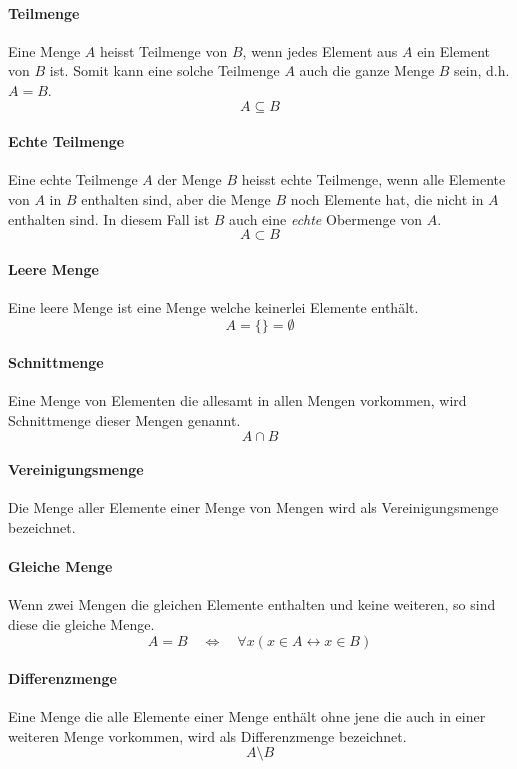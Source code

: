 \paragraph{Teilmenge} 
Eine Menge $A$ heisst \gls{Teilmenge} von $B$, wenn jedes Element aus 
$A$ ein Element von $B$ ist. Somit kann eine solche Teilmenge $A$
auch die ganze Menge $B$ sein, d.h. $A=B$.
\[ 
	A \subseteq B
\]
\paragraph{Echte Teilmenge}
Eine \gls{echte Teilmenge} $A$ der Menge $B$ heisst echte Teilmenge, wenn
alle Elemente von $A$ in $B$ enthalten sind, aber die Menge $B$ noch
Elemente hat, die nicht in $A$ enthalten sind. In diesem Fall ist $B$ 
auch eine \emph{echte} Obermenge von $A$.
\[
	A \subset B
\]

\paragraph{Leere Menge} Eine \gls{leere Menge} ist eine Menge welche 
keinerlei Elemente enthält.
\[  
	A = \{\} = \emptyset
\]

\paragraph{Schnittmenge} Eine Menge von Elementen die allesamt in
allen Mengen vorkommen, wird \gls{Schnittmenge} dieser Mengen genannt.
\[ 
	A \cap B
\]

\paragraph{Vereinigungsmenge} Die Menge aller Elemente einer Menge
von Mengen wird als \gls{Vereinigungsmenge} bezeichnet.

\paragraph{Gleiche Menge} Wenn zwei Mengen die gleichen Elemente
enthalten und keine weiteren, so sind diese die \gls{gleiche Menge}.
\[  
	A = B 
	\quad \Leftrightarrow \quad 
	\forall x (x \in A \leftrightarrow x \in B)
\]

\paragraph{Differenzmenge}
Eine Menge die alle Elemente einer Menge enthält ohne jene die auch
in einer weiteren Menge vorkommen, wird als \gls{Differenzmenge} 
bezeichnet.
\[  
	A \setminus  B
\]

